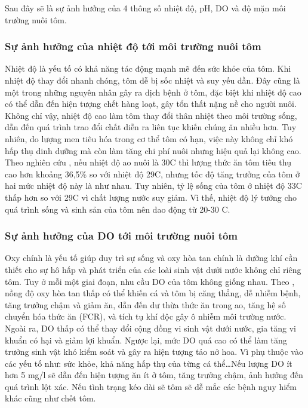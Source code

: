 \documentclass{article} %
\begin{document}
	Sau đây sẽ là sự ảnh hưởng của 4 thông số nhiệt độ, pH, DO và độ mặn môi trường nuôi tôm.
	
	\subsubsection{ Sự ảnh hưởng của nhiệt độ tới môi trường nuôi tôm}
	
	Nhiệt độ là yếu tố có khả năng tác động mạnh mẽ đến sức khỏe của tôm. Khi nhiệt độ thay đổi nhanh chóng, tôm dễ bị sốc nhiệt và suy yếu dần. Đây cũng là một trong những nguyên nhân gây ra dịch bệnh ở tôm, đặc biệt khi nhiệt độ cao có thể dẫn đến hiện tượng chết hàng loạt, gây tổn thất nặng nề cho người nuôi.
	Không chỉ vậy, nhiệt độ cao làm tôm thay đổi thân nhiệt theo môi trường sống, dẫn đến quá trình trao đổi chất diễn ra liên tục khiến chúng ăn nhiều hơn. Tuy nhiên, do lượng men tiêu hóa trong cơ thể tôm có hạn, việc này không chỉ khó hấp thụ dinh dưỡng mà còn làm tăng chi phí nuôi nhưng hiệu quả lại không cao.
	Theo nghiên cứu \cite{ambio}, nếu nhiệt độ ao nuôi là 30\textdegree C thì lượng thức ăn tôm tiêu thụ cao hơn khoảng 36,5\% so với nhiệt độ 29\textdegree C, nhưng tốc độ tăng trưởng của tôm ở hai mức nhiệt độ này là như nhau. Tuy nhiên, tỷ lệ sống của tôm ở nhiệt độ 33\textdegree C thấp hơn so với 29\textdegree C vì chất lượng nước suy giảm. 
	Vì thế, nhiệt độ lý tưởng cho quá trình sống và sinh sản của tôm nên dao động từ 20-30 \textdegree C.
	
	\subsubsection{ Sự ảnh hưởng của DO tới môi trường nuôi tôm}
	
	Oxy chính là yếu tố giúp duy trì sự sống và oxy hòa tan chính là dưỡng khí cần thiết cho sự hô hấp và phát triển của các loài sinh vật dưới nước không chỉ riêng tôm. Tuy ở mỗi một giai đoạn, nhu cầu DO của tôm không giống nhau. Theo \cite{DO}, nồng độ oxy hòa tan thấp có thể khiến cá và tôm bị căng thẳng, dễ nhiễm bệnh, tăng trưởng chậm và giảm ăn, dẫn đến dư thừa thức ăn trong ao, tăng hệ số chuyển hóa thức ăn (FCR), và tích tụ khí độc gây ô nhiễm môi trường nước. Ngoài ra, DO thấp có thể thay đổi cộng đồng vi sinh vật dưới nước, gia tăng vi khuẩn có hại và giảm lợi khuẩn. Ngược lại, mức DO quá cao có thể làm tăng trưởng sinh vật khó kiểm soát và gây ra hiện tượng tảo nở hoa. Vì phụ thuộc vào các yếu tố như: sức khỏe, khả năng hấp thụ của từng cá thể…Nếu lượng DO ít hơn 5 mg/l sẽ dẫn đến hiện tượng ăn ít ở tôm, tăng trưởng chậm, ảnh hưởng đến quá trình lột xác. Nếu tình trạng kéo dài sẽ tôm sẽ dễ mắc các bệnh nguy hiểm khác cũng như chết tôm.
	
\end{document}
